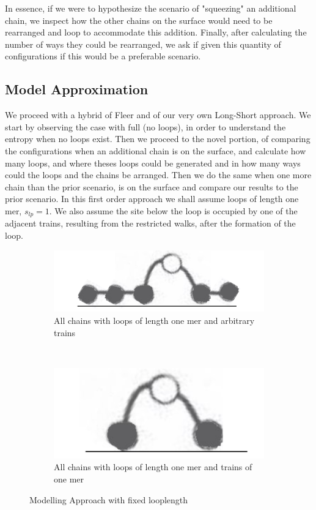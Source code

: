 \documentclass[10pt,letterpaper]{article}
\begin{document}
\noindent In essence, if we were to hypothesize the scenario of "squeezing" an additional chain, we inspect how the other chains on the surface would need to be rearranged and loop to accommodate this addition. Finally, after calculating the number of ways they could be rearranged, we ask if given this quantity of configurations if this would be a preferable scenario.

\subsection{Model Approximation}
We proceed with a hybrid of Fleer \cite{fleer1993polymers} and of our very own Long-Short approach. We start by observing the case with full (no loops), in order to understand the entropy when no loops exist. Then we proceed to the novel portion, of comparing the configurations when an additional chain is on the surface, and calculate how many loops, and where theses loops could be generated and in how many ways could the loops and the chains be arranged. Then we do the same when one more chain than the prior scenario, is on the surface and compare our results to the prior scenario. In this first order approach we shall assume loops of length one mer, $s_{lp}=1$. We also assume the site below the loop is occupied by one of the adjacent trains, resulting from the restricted walks, after the formation of the loop.


\begin{figure}[h!]
	\centering
	\begin{subfigure}[b]{0.3\textwidth}
		\centering
		\includegraphics[scale=0.2]{loop1_trains.png}
		\caption{All chains with loops of length one mer and arbitrary trains}
		\label{loop and train}
	\end{subfigure}~~~~~~~~~~~~
	\begin{subfigure}[b]{0.3\textwidth}
		\centering
		\includegraphics[scale=0.2]{loop1.png}
		\caption{All chains with loops of length one mer and trains of one mer}
		\label{loop}
	\end{subfigure}
	\caption{Modelling Approach with fixed looplength}
\end{figure}
\end{document}
